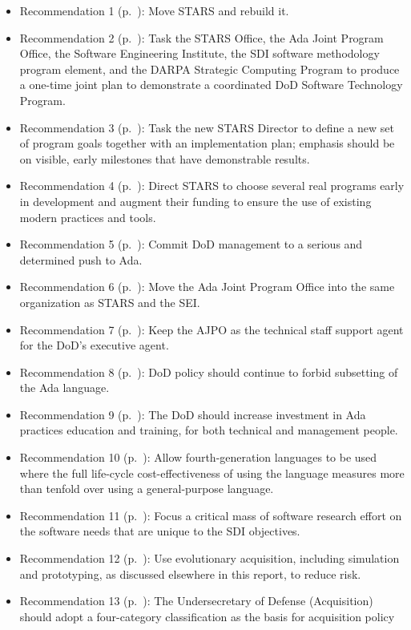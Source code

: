 \documentclass[11pt,final]{article}
\begin{document}
\begin{itemize}
    \item Recommendation 1 (p.~\pageref{rec:1}): Move STARS and rebuild it.
    \item Recommendation 2 (p.~\pageref{rec:2}): Task the STARS Office, the Ada Joint Program Office, the Software Engineering Institute, the SDI software methodology program element, and the DARPA Strategic Computing Program to produce a one-time joint plan to demonstrate a coordinated DoD Software Technology Program.
    \item Recommendation 3 (p.~\pageref{rec:3}): Task the new STARS Director to define a new set of program goals together with an implementation plan; emphasis should be on visible, early milestones that have demonstrable results.
    \item Recommendation 4 (p.~\pageref{rec:4}): Direct STARS to choose several real programs early in development and augment their funding to ensure the use of existing modern practices and tools.
    \item Recommendation 5 (p.~\pageref{rec:5}): Commit DoD management to a serious and determined push to Ada.
    \item Recommendation 6 (p.~\pageref{rec:6}): Move the Ada Joint Program Office into the same organization as STARS and the SEI.
    \item Recommendation 7 (p.~\pageref{rec:7}): Keep the AJPO as the technical staff support agent for the DoD’s executive agent.
    \item Recommendation 8 (p.~\pageref{rec:8}): DoD policy should continue to forbid subsetting of the Ada language.
    \item Recommendation 9 (p.~\pageref{rec:9}): The DoD should increase investment in Ada practices education and training, for both technical and management people.
    \item Recommendation 10 (p.~\pageref{rec:10}): Allow fourth-generation languages to be used where the full life-cycle cost-effectiveness of using the language measures more than tenfold over using a general-purpose language.
    \item Recommendation 11 (p.~\pageref{rec:11}): Focus a critical mass of software research effort on the software needs that are unique to the SDI objectives.
    \item Recommendation 12 (p.~\pageref{rec:12}): Use evolutionary acquisition, including simulation and prototyping, as discussed elsewhere in this report, to reduce risk.
    \item Recommendation 13 (p.~\pageref{rec:13}): The Undersecretary of Defense (Acquisition) should adopt a four-category classification as the basis for acquisition policy

\end{itemize}
\end{document}
